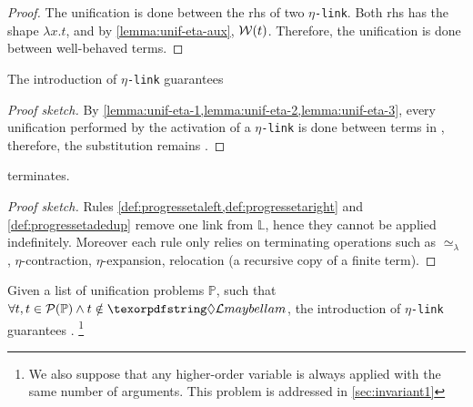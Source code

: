 \documentclass[sigconf,natbib=false,review]{acmart}
\newcommand{\UnifRel}{\ensuremath{\simeq}}
\newcommand{\Ue}{\ensuremath{\UnifRel_\lambda}\xspace}
\newcommand{\linkMacro}[1]{\ensuremath{#1}\texttt{-link}\xspace}
\newcommand{\linketa} {\linkMacro{\eta}}
\newcommand{\rhs}{rhs\xspace}
\newcommand{\linkStore}{\texorpdfstring{\ensuremath{\mathbb{L}}\xspace}{L}}
\newcommand{\foUnifPb}{\ensuremath{\mathbb{P}}\xspace}
\begin{document}
\begin{proof}
  The unification is done between the \rhs of two \linketa. Both \rhs has the
  shape $\lambda x.t$, and by \cref{lemma:unif-eta-aux}, $\mathcal{W}(t)$.
  Therefore, the unification is done between well-behaved terms.
\end{proof}

\begin{lemma}
  The introduction of \linketa guarantees 
  \label{lemma:unif-wellb}
\end{lemma}

\begin{proof}[Proof sketch]
  By \cref{lemma:unif-eta-1,lemma:unif-eta-2,lemma:unif-eta-3}, every
  unification performed by the activation of a \linketa is done between
  terms in \wellb, therefore, the substitution remains \wellb.
\end{proof}

\begin{lemma}
   terminates.
  \label{lemma:prog-eta-terminates}
\end{lemma}

\begin{proof}[Proof sketch]
  Rules \cref{def:progressetaleft,def:progressetaright} and
  \cref{def:progressetadedup} remove one link from \linkStore, hence they
  cannot be applied indefinitely.
  Moreover each rule only relies on terminating operations such as \Ue,
  $\eta$-contraction, $\eta$-expansion, relocation (a recursive copy of a
  finite term).
\end{proof}

\begin{theorem}
  Given a list of unification problems \foUnifPb, such that 
  $\forall t, t\in\subterm{\foUnifPb} \land t \notin \notllambda$, 
  the introduction 
  of \linketa guarantees .
  \footnote{We also suppose that any higher-order variable is always applied with
  the same number of arguments. This problem is addressed in \cref{sec:invariant1}}
  \label{lemma:fidelity-maybeeta}
\end{theorem}
\end{document}

